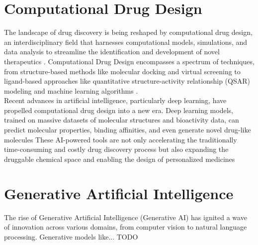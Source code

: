\section{Computational Drug Design} 
The landscape of drug discovery is being reshaped by computational drug design, an interdisciplinary
field that harnesses computational models, simulations, and data analysis to streamline the
identification and development of novel therapeutics \cite{schneider2020rethinking}. Computational
Drug Design encompasses a spectrum of techniques, from structure-based methods like molecular
docking \cite{kitchen2004docking} and virtual screening \cite{shoichet2004virtual} to ligand-based
approaches like quantitative structure-activity relationship (QSAR) modeling
\cite{cherkasov2014qsar} and machine learning algorithms \cite{gawehn2016dl}. \\

Recent advances in artificial intelligence, particularly deep learning, have propelled computational
drug design into a new era. Deep learning models, trained on massive datasets of molecular
structures and bioactivity data, can predict molecular properties, binding affinities, and even
generate novel drug-like molecules \cite{zeng2022deep} These AI-powered tools are not only
accelerating the traditionally time-consuming and costly drug discovery process but also expanding
the druggable chemical space and enabling the design of personalized medicines \cite{gawehn2016dl}


\section{Generative Artificial Intelligence} 
The rise of Generative Artificial Intelligence (Generative AI) has ignited a wave of innovation across various domains,
from computer vision to natural language processing. Generative models like... TODO

